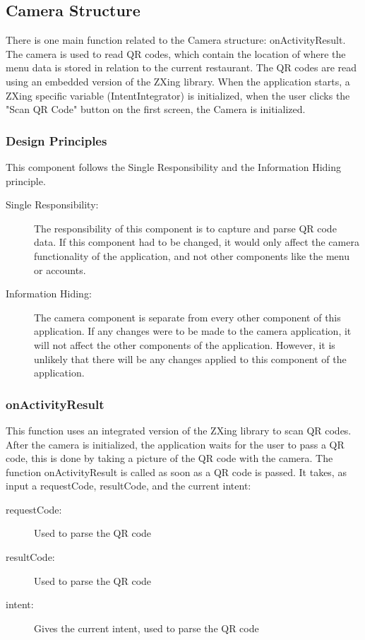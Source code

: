 \documentclass[12pt, titlepage]{article}
\begin{document}
\subsection{Camera Structure}
There is one main function related to the Camera structure: onActivityResult. The camera is used to read QR codes, which contain the location of where the menu data is stored in relation to the current restaurant. The QR codes are read using an embedded version of the ZXing library. When the application starts, a ZXing specific variable (IntentIntegrator) is initialized, when the user clicks the "Scan QR Code" button on the first screen, the Camera is initialized. 

\subsubsection{Design Principles}
This component follows the Single Responsibility and the Information Hiding principle.  

\begin{description}
	\item[Single Responsibility:] The responsibility of this component is to capture and parse QR code data. If this component had to be changed, it would only affect the camera functionality of the application, and not other components like the menu or accounts.
	\item[Information Hiding:] The camera component is separate from every other component of this application. If any changes were to be made to the camera application, it will not affect the other components of the application. However, it is unlikely that there will be any changes applied to this component of the application.
\end{description}

\subsubsection{onActivityResult}
This function uses an integrated version of the ZXing library to scan QR codes. After the camera is initialized, the application waits for the user to pass a QR code, this is done by taking a picture of the QR code with the camera. The function onActivityResult is called as soon as a QR code is passed. It takes, as input a requestCode, resultCode, and the current intent: 

\begin{description}
  \item[requestCode:] Used to parse the QR code 
  \item[resultCode:] Used to parse the QR code 
  \item[intent:] Gives the current intent, used to parse the QR code
\end{description}
\end{document}
